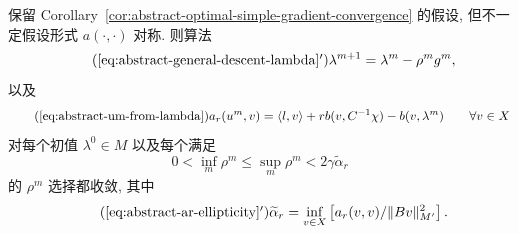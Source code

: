 \setcounter{statement}{6}
\begin{Theorem}\label{thm:abstract-nonoptimal-gradient-convergence}
保留 Corollary~\ref{cor:abstract-optimal-simple-gradient-convergence} 的假设,
但不一定假设形式 $a(\cdot,\cdot)$ 对称. 则算法
\begin{equation}\tag{\ref*{eq:abstract-general-descent-lambda}$'$}
\label{eq:abstract-nonoptimal-lambda-update}
\lambda^{m+1}=\lambda^m-\rho^mg^m,
\end{equation}
以及
\begin{equation*}\tag{\ref*{eq:abstract-um-from-lambda}}
a_r(u^m,v)=\langle l,v\rangle
+r b(v,C^{-1}\chi)-b(v,\lambda^m)
\qquad\forall v\in X
\end{equation*}
对每个初值 $\lambda^0\in M$ 以及每个满足
\begin{equation}\label{eq:abstract-nonoptimal-step-range}
0<\inf_m\rho^m\le\sup_m\rho^m<2\gamma\widetilde\alpha_r
\end{equation}
的 $\rho^m$ 选择都收敛, 其中
\begin{equation}\tag{\ref*{eq:abstract-ar-ellipticity}$'$}
\label{eq:abstract-alpha-r-tilde}
\widetilde\alpha_r
=\inf_{v\in X}\left[a_r(v,v)/\|Bv\|_{M'}^2\right].
\end{equation}
\end{Theorem}

